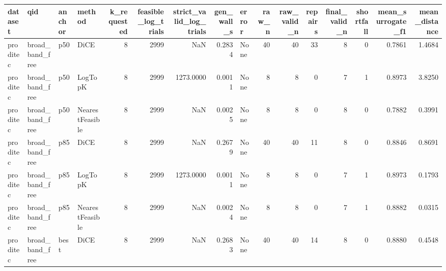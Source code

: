 \begin{tabular}{llllrrrrlrrrrrrr}
\toprule
 dataset &                  qid & anchor &          method &  k\_requested &  feasible\_log\_trials &  strict\_valid\_log\_trials &  gen\_wall\_s &                                              error &  raw\_n &  raw\_valid\_n &  repairs &  final\_valid\_n &  shortfall &  mean\_surrogate\_f1 &  mean\_distance \\
\midrule
proditec &      broad\_band\_free &    p50 &            DiCE &            8 &                 2999 &                      NaN &      0.2834 &                                               None &     40 &           40 &       33 &              8 &          0 &             0.7861 &         1.4684 \\
proditec &      broad\_band\_free &    p50 &         LogTopK &            8 &                 2999 &                1273.0000 &      0.0011 &                                               None &      8 &            8 &        0 &              7 &          1 &             0.8973 &         3.8250 \\
proditec &      broad\_band\_free &    p50 & NearestFeasible &            8 &                 2999 &                      NaN &      0.0025 &                                               None &      8 &            8 &        0 &              8 &          0 &             0.7882 &         0.3991 \\
proditec &      broad\_band\_free &    p85 &            DiCE &            8 &                 2999 &                      NaN &      0.2679 &                                               None &     40 &           40 &       11 &              8 &          0 &             0.8846 &         0.8691 \\
proditec &      broad\_band\_free &    p85 &         LogTopK &            8 &                 2999 &                1273.0000 &      0.0011 &                                               None &      8 &            8 &        0 &              7 &          1 &             0.8973 &         0.1793 \\
proditec &      broad\_band\_free &    p85 & NearestFeasible &            8 &                 2999 &                      NaN &      0.0024 &                                               None &      8 &            8 &        0 &              7 &          1 &             0.8882 &         0.0315 \\
proditec &      broad\_band\_free &   best &            DiCE &            8 &                 2999 &                      NaN &      0.2683 &                                               None &     40 &           40 &       14 &              8 &          0 &             0.8880 &         0.4548 \\

\end{tabular}

